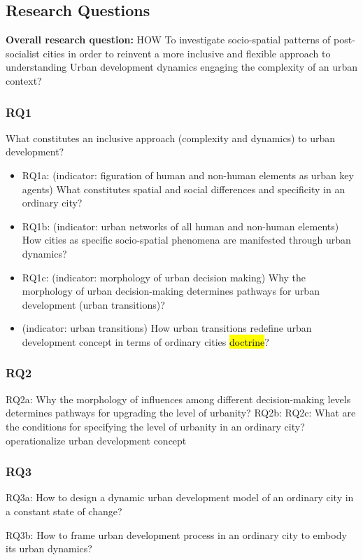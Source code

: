 \documentclass[11pt]{report}
\begin{document}
\subsection{Research Questions}
\textbf{Overall research question:} HOW To investigate socio-spatial patterns of post-socialist cities in order to reinvent a more inclusive and flexible approach to understanding Urban development dynamics engaging the complexity of an urban context? 

\subsubsection{RQ1}
What constitutes an inclusive approach (complexity and dynamics) to urban development?
\begin{itemize}
\item RQ1a: (indicator: figuration of human and non-human elements as urban key agents) What constitutes spatial and social differences and specificity in an ordinary city? 
\item RQ1b: (indicator: urban networks of all human and non-human elements) How cities as specific socio-spatial phenomena are manifested through urban dynamics?
\item RQ1c: (indicator: morphology of urban decision making) Why the morphology of urban decision-making determines pathways for urban development (urban transitions)?
\item (indicator: urban transitions) How urban transitions redefine urban development concept in terms of ordinary cities \hl{doctrine}?
\end {itemize}

\subsubsection{RQ2}

RQ2a: Why the morphology of influences among different decision-making levels determines pathways for upgrading the level of urbanity?
RQ2b:  
RQ2c: What are the conditions for specifying the level of urbanity in an ordinary city?
operationalize urban development concept
\subsubsection{RQ3}

RQ3a: How to design a dynamic urban development model of an ordinary city in a constant state of change? 

RQ3b: How to frame urban development process in an ordinary city to embody its urban dynamics?
\end{document}
